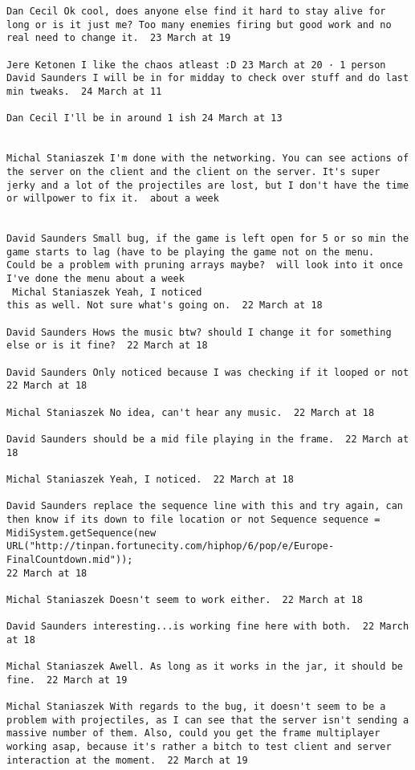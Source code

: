 \documentclass[10pt]{report}
\begin{document}
\begin{verbatim}
Dan Cecil Ok cool, does anyone else find it hard to stay alive for
long or is it just me? Too many enemies firing but good work and no
real need to change it.  23 March at 19

Jere Ketonen I like the chaos atleast :D 23 March at 20 · 1 person
David Saunders I will be in for midday to check over stuff and do last
min tweaks.  24 March at 11

Dan Cecil I'll be in around 1 ish 24 March at 13


Michal Staniaszek I'm done with the networking. You can see actions of
the server on the client and the client on the server. It's super
jerky and a lot of the projectiles are lost, but I don't have the time
or willpower to fix it.  about a week 


David Saunders Small bug, if the game is left open for 5 or so min the
game starts to lag (have to be playing the game not on the menu.
Could be a problem with pruning arrays maybe?  will look into it once
I've done the menu about a week 
 Michal Staniaszek Yeah, I noticed
this as well. Not sure what's going on.  22 March at 18

David Saunders Hows the music btw? should I change it for something
else or is it fine?  22 March at 18

David Saunders Only noticed because I was checking if it looped or not
22 March at 18

Michal Staniaszek No idea, can't hear any music.  22 March at 18

David Saunders should be a mid file playing in the frame.  22 March at
18

Michal Staniaszek Yeah, I noticed.  22 March at 18

David Saunders replace the sequence line with this and try again, can
then know if its down to file location or not Sequence sequence =
MidiSystem.getSequence(new
URL("http://tinpan.fortunecity.com/hiphop/6/pop/e/Europe-FinalCountdown.mid"));
22 March at 18

Michal Staniaszek Doesn't seem to work either.  22 March at 18

David Saunders interesting...is working fine here with both.  22 March
at 18

Michal Staniaszek Awell. As long as it works in the jar, it should be
fine.  22 March at 19

Michal Staniaszek With regards to the bug, it doesn't seem to be a
problem with projectiles, as I can see that the server isn't sending a
massive number of them. Also, could you get the frame multiplayer
working asap, because it's rather a bitch to test client and server
interaction at the moment.  22 March at 19


\end{verbatim}
\end{document}
